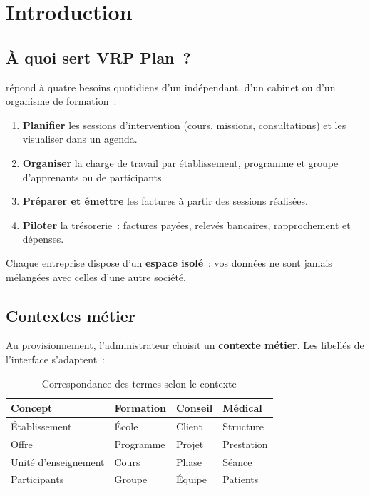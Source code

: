 \chapter{Introduction}
\label{ch:introduction}

\section{À quoi sert VRP Plan~?}

\manualproduct{} répond à quatre besoins quotidiens d'un indépendant, d'un cabinet ou d'un organisme de formation~:

\begin{enumerate}[label=\textbf{\arabic*.}]
  \item \textbf{Planifier} les sessions d'intervention (cours, missions, consultations) et les visualiser dans un agenda.
  \item \textbf{Organiser} la charge de travail par établissement, programme et groupe d'apprenants ou de participants.
  \item \textbf{Préparer et émettre} les factures à partir des sessions réalisées.
  \item \textbf{Piloter} la trésorerie~: factures payées, relevés bancaires, rapprochement et dépenses.
\end{enumerate}

Chaque entreprise dispose d'un \textbf{espace isolé}~: vos données ne sont jamais mélangées avec celles d'une autre société.

\section{Contextes métier}

Au provisionnement, l'administrateur choisit un \textbf{contexte métier}. Les libellés de l'interface s'adaptent~:

\begin{table}[htbp]
  \centering
  \caption{Correspondance des termes selon le contexte}
  \begin{tabular}{@{}llll@{}}
    \toprule
    \textbf{Concept} & \textbf{Formation} & \textbf{Conseil} & \textbf{Médical} \\
    \midrule
    Établissement    & École            & Client           & Structure \\
    Offre            & Programme        & Projet           & Prestation \\
    Unité d'enseignement & Cours        & Phase            & Séance \\
    Participants     & Groupe           & Équipe           & Patients \\
    \bottomrule
  \end{tabular}
\end{table}

